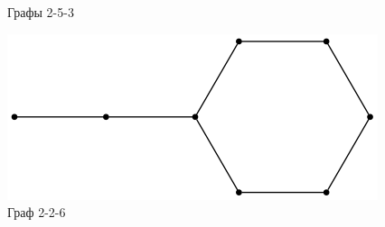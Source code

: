 \begin{solution}
\begin{figure}[H]
    \caption{Графы 2-5-3} \label{group 2-5-3}
\end{figure}

\begin{figure}[H]
    \centering
    \includegraphics[scale=0.4]{Fall/img/solution-441_226_0.dot.png}
    \caption{Граф 2-2-6} \label{group 2-2-6}
\end{figure}


\end{solution}
